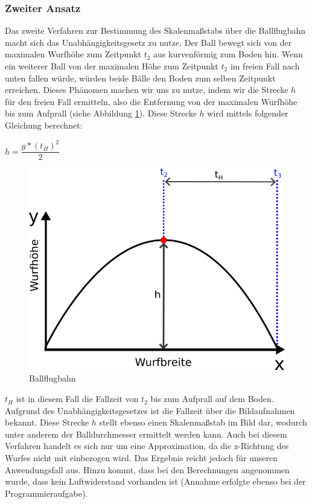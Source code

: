 \documentclass{ezb}
\begin{document}
\subsubsection*{Zweiter Ansatz}
Das zweite Verfahren zur Bestimmung des Skalenmaßstabs über die Ballflugbahn macht sich das Unabhängigkeitsgesetz zu nutze. Der Ball bewegt sich von der maximalen Wurfhöhe zum Zeitpunkt $t_2$ aus kurvenförmig zum Boden hin. Wenn ein weiterer Ball von der maximalen Höhe zum Zeitpunkt $t_2$ im freien Fall nach unten fallen würde, würden beide Bälle den Boden zum selben Zeitpunkt erreichen. Dieses Phänomen machen wir uns zu nutze, indem wir die Strecke $h$ für den freien Fall ermitteln, also die Entfernung von der maximalen Wurfhöhe bis zum Aufprall (siehe Abbildung \ref{abb:freierfall}). Diese Strecke $h$ wird mittels folgender Gleichung berechnet:
\begin{center}
$h = \dfrac{g * (t_H)^2}{2}$
\end{center}
\begin{figure}[!h]
	\centering
	\includegraphics[scale=1.5]{./img/BallflugbahnAnsatz2.png}
	\caption{Ballflugbahn}
	\label{abb:freierfall}
\end{figure}
$t_H$ ist in diesem Fall die Fallzeit von $t_2$ bis zum Aufprall auf dem Boden. Aufgrund des Unabhängigkeitsgesetzes ist die Fallzeit über die Bildaufnahmen bekannt.
Diese Strecke $h$ stellt ebenso einen Skalenmaßstab im Bild dar, wodurch unter anderem der Balldurchmesser ermittelt werden kann. Auch bei diesem Verfahren handelt es sich nur um eine Approximation, da die z-Richtung des Wurfes nicht mit einbezogen wird. Das Ergebnis reicht jedoch für unseren Anwendungsfall aus.
Hinzu kommt, dass bei den Berechnungen angenommen wurde, dass kein Luftwiderstand vorhanden ist (Annahme erfolgte ebenso bei der Programmieraufgabe).




\end{document}
